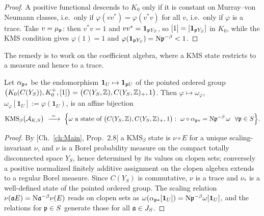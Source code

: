\begin{proof}
A positive functional descends to $K_0$ only if it is constant on Murray--von Neumann
classes, i.e.\ only if $\varphi(vv^*)=\varphi(v^*v)$ for all $v$, i.e.\ only if $\varphi$ is
a trace. Take $v=\mu_{\mathfrak{p}}$: then $v^*v=1$ and $vv^*=\mathbf 1_{\mathfrak{p} Y_S}$, so
$[1]=[\mathbf 1_{\mathfrak{p} Y_S}]$ in $K_0$, while the KMS condition gives $\varphi(1)=1$ and
$\varphi(\mathbf 1_{\mathfrak{p} Y_S})=\mathrm{N}\mathfrak{p}^{-\beta}<1$.
\end{proof}

The remedy is to work on the coefficient algebra, where a KMS state restricts to a measure
and hence to a trace.

\begin{theorem}\label{III:thm:eigen}
Let $\alpha_{\mathfrak{p}*}$ be the endomorphism $\mathbf 1_U\mapsto\mathbf 1_{\mathfrak{p} U}$ of the pointed
ordered group $\bigl(K_0(C(Y_S)),K_0^+,[1]\bigr)=\bigl(C(Y_S,\mathbb{Z}),C(Y_S,\mathbb{Z})_+,1\bigr)$. Then
$\varphi\mapsto\omega_\varphi$, $\omega_\varphi[\mathbf 1_U]:=\varphi(\mathbf 1_U)$, is an
affine bijection
\[
\mathrm{KMS}_\beta\bigl(\cA_{K,S}\bigr)\ \xrightarrow{\ \sim\ }\
\Bigl\{\omega\ \text{a state of }\bigl(C(Y_S,\Z),C(Y_S,\Z)_+,1\bigr):\
\omega\circ\alpha_{\pp*}=\Ns\pp^{-\beta}\,\omega\ \ \forall\pp\in S\Bigr\}.
\]
\end{theorem}

\begin{proof}
By [Ch.~\ref{ch:Main}, Prop.~2.8] a $\mathrm{KMS}_\beta$ state is $\nu\circ E$ for a unique
scaling-invariant $\nu$, and $\nu$ is a Borel probability measure on the compact totally
disconnected space $Y_S$, hence determined by its values on clopen sets; conversely a
positive normalized finitely additive assignment on the clopen algebra extends to a regular
Borel measure. Since $C(Y_S)$ is commutative, $\nu$ is a trace and $\nu_*$ is a well-defined
state of the pointed ordered group. The scaling relation $\nu(\mathfrak{a} E)=\mathrm{N}\mathfrak{a}^{-\beta}\nu(E)$
reads on clopen sets as $\omega(\alpha_{\mathfrak{p}*}[\mathbf 1_U])=\mathrm{N}\mathfrak{p}^{-\beta}\omega[\mathbf 1_U]$,
and the relations for $\mathfrak{p}\in S$ generate those for all $\mathfrak{a}\in J_S$.
\end{proof}

